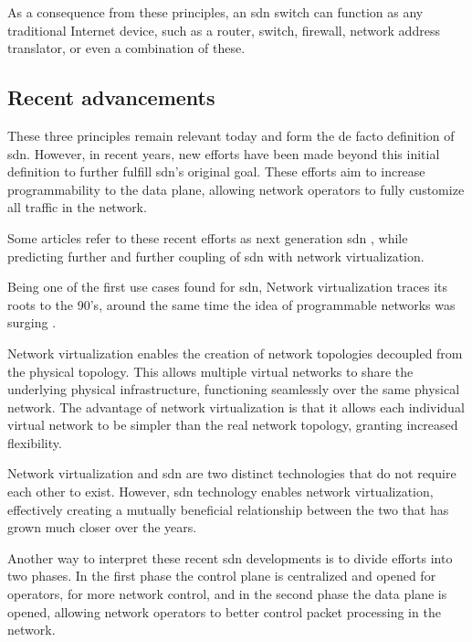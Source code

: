 As a consequence from these principles, an \gls{sdn} switch can function as any traditional Internet device, such as a router, switch, firewall, network address translator, or even a combination of these. 

\subsection{Recent advancements}
These three principles remain relevant today and form the de facto definition of \gls{sdn}. However, in recent years, new efforts have been made beyond this initial definition to further fulfill \gls{sdn}'s original goal. These efforts aim to increase programmability to the data plane, allowing network operators to fully customize all traffic in the network.

Some articles refer to these recent efforts as next generation \gls{sdn} \cite{liatifis_advancing_2023}\cite{sofia_shaping_2024}, while predicting further and further coupling of \gls{sdn} with network virtualization.

Being one of the first use cases found for \gls{sdn}, Network virtualization traces its roots to the 90's, around the same time the idea of programmable networks was surging\cite{kreutz_software-defined_2015} \cite{feamster_road_2013}.  

Network virtualization enables the creation of network topologies decoupled from the physical topology. This allows multiple virtual networks to share the underlying physical infrastructure, functioning seamlessly over the same physical network\cite{thyagaturu_software_2016}.  The advantage of network virtualization is that it allows each individual virtual network to be simpler than the real network topology, granting increased flexibility. 

Network virtualization and \gls{sdn} are two distinct technologies that do not require each other to exist. However, \gls{sdn} technology enables network virtualization, effectively creating a mutually beneficial relationship between the two that has grown much closer over the years\cite{feamster_road_2013}.

Another way to interpret these recent \gls{sdn} developments is to divide efforts into two phases. In the first phase the control plane is centralized and opened for operators, for more network control, and in the second phase the data plane is opened, allowing network operators to better control packet processing in the network. 

